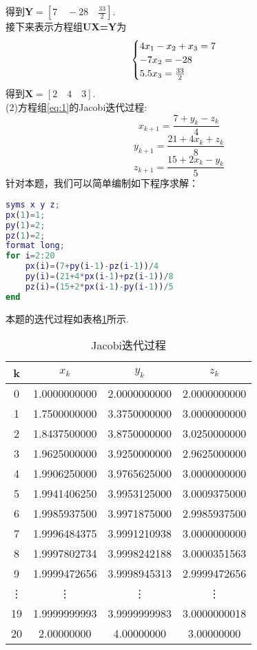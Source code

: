 \documentclass[UTF8]{ctexart}
\begin{document}
得到$\textbf{Y} = [7 \quad -28 \quad \frac{33}{2}]$.\\
接下来表示方程组\textbf{UX=Y}为
\begin{equation}
	\begin{cases}
		4x_1 - x_2 + x_3 = 7 \\
		-7x_2 = -28 \\
		5.5x_3 = \frac{33}{2} \notag
	\end{cases}
\end{equation}
得到$\textbf{X} = [2 \quad 4 \quad 3]$.\\
(2)方程组\ref{eq:1}的Jacobi迭代过程:\\
\[x_{k+1}=\frac{7+y_k-z_k}{4}\]
\[y_{k+1}=\frac{21+4x_k+z_k}{8}\]
\[z_{k+1}=\frac{15+2x_k-y_k}{5}\]
针对本题，我们可以简单编制如下程序求解：\\
\begin{lstlisting}[language=matlab]
syms x y z;
px(1)=1;
py(1)=2;
pz(1)=2;
format long;
for i=2:20
	px(i)=(7+py(i-1)-pz(i-1))/4
	py(i)=(21+4*px(i-1)+pz(i-1))/8
	pz(i)=(15+2*px(i-1)-py(i-1))/5
end
\end{lstlisting}
本题的迭代过程如表格\ref{tab:t1}所示.\\
\begin{table}[h]
	\caption{Jacobi迭代过程}
	\label{tab:t1}
	\centering
	\begin{tabular}{c|c|c|c}
		\hline
		k  &  $x_k$  & $y_k$  & $z_k$\\
		\hline
		0   & 1.0000000000 & 2.0000000000 & 2.0000000000 \\
		1	& 1.7500000000 & 3.3750000000 & 3.0000000000 \\
		2	& 1.8437500000 & 3.8750000000 & 3.0250000000 \\
		3	& 1.9625000000 & 3.9250000000 & 2.9625000000 \\
		4	& 1.9906250000 & 3.9765625000 & 3.0000000000 \\
		5	& 1.9941406250 & 3.9953125000 & 3.0009375000 \\
		6	& 1.9985937500 & 3.9971875000 & 2.9985937500 \\
		7	& 1.9996484375 & 3.9991210938 & 3.0000000000 \\
		8	& 1.9997802734 & 3.9998242188 & 3.0000351563 \\
		9	& 1.9999472656 & 3.9998945313 & 2.9999472656 \\
		\vdots & \vdots & \vdots & \vdots \\
		19  & 1.9999999993 & 3.9999999983 & 3.0000000018 \\
		20  & 2.00000000 & 4.00000000 & 3.00000000 \\
		\hline
	\end{tabular}
\end{table}
\end{document}
